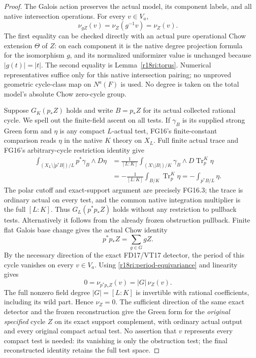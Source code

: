 \begin{proof}
The Galois action preserves the actual model, its component labels,
and all native intersection operations.  For every $v\in V_a$,
\[
                          \nu_{gZ}(v)=\nu_Z(g^{-1}v)=\nu_Z(v).
 \tag{RI18.10}\label{r18ri:period-equivariance}
\]
The first equality can be checked directly with an actual pure
operational Chow extension $\Theta$ of $Z$: on each component it
is the native degree projection formula for the isomorphism $g$,
and its normalized uniformizer value is unchanged because
$|g(t)|=|t|$.  The second equality is
Lemma~\ref{r18ri:torus}.  Numerical representatives suffice only
for this native intersection pairing; no unproved geometric
cycle-class map on $N^a(F)$ is used.  No degree is taken on the
total model's absolute Chow zero-cycle group.

Suppose $G_K(p_*Z)$ holds and write $B=p_*Z$ for its actual
collected rational cycle.  We spell out the finite-field ascent on
all tests.  If $\gamma_B$ is its supplied strong Green form and
$\eta$ is any compact $L$-actual test, FG16's finite-constant
comparison reads $\eta$ in the native $K$ theory on $X_L$.
Full finite actual trace and FG16's arbitrary-cycle restriction
identity give
\[
\begin{aligned}
 \int_{(X_L\setminus|p^*B|)/L}p^*\gamma_B\wedge D\eta
 &=\frac1{[L:K]}
     \int_{(X\setminus|B|)/K}
            \gamma_B\wedge D\operatorname{Tr}_p^K\eta\\
 &=-\frac1{[L:K]}\int_{B/K}\operatorname{Tr}_p^K\eta
   =-\int_{p^*B/L}\eta .
\end{aligned}
\]
The polar cutoff and exact-support argument are precisely FG16.3;
the trace is ordinary actual on every test, and the common native
integration multiplier is the full $[L:K]$.  Thus $G_L(p^*p_*Z)$
holds without any restriction to pullback tests.  Alternatively it
follows from the already frozen obstruction pullback.  Finite flat
Galois base change gives the actual Chow identity
\[
                             p^*p_*Z=\sum_{g\in G}gZ.
 \tag{RI18.11}\label{r18ri:norm-identity}
\]
By the necessary direction of the exact FD17/VT17 detector, the
period of this cycle vanishes on every $v\in V_a$.
Using \eqref{r18ri:period-equivariance} and linearity gives
\[
                   0=\nu_{p^*p_*Z}(v)=|G|\,\nu_Z(v).
 \tag{RI18.12}\label{r18ri:averaging}
\]
The full nonzero field degree $|G|=[L:K]$ is invertible with
rational coefficients, including its wild part.  Hence
$\nu_Z=0$.  The sufficient direction of the same exact detector
and the frozen reconstruction give the Green form for the
\emph{original specified} cycle $Z$ on its exact support complement,
with ordinary actual output and every original compact actual test.
No assertion that $v$ represents every compact test is needed:
its vanishing is only the obstruction test; the final reconstructed
identity retains the full test space.


\end{proof}
